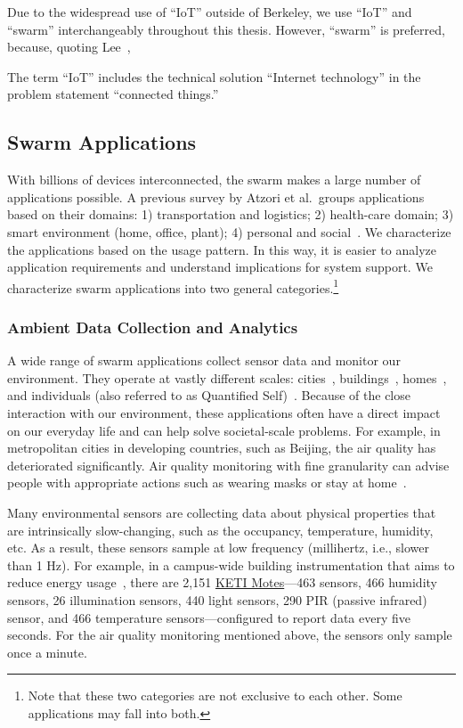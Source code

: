 Due to the widespread use of ``IoT'' outside of Berkeley, we use ``IoT'' and
``swarm'' interchangeably throughout this thesis. However, ``swarm'' is
preferred, because, quoting Lee~\cite{lee2016iot},

\begin{displayquote}
  The term ``IoT'' includes the technical solution ``Internet technology'' in
  the problem statement ``connected things.''
\end{displayquote}

\subsection{Swarm Applications}
\label{sec:swarm-applications}

With billions of devices interconnected, the swarm makes a large number of
applications possible. A previous survey by Atzori et al.\, groups applications
based on their domains: 1) transportation and logistics; 2) health-care domain;
3) smart environment (home, office, plant); 4) personal and
social~\cite{atzori2010internet}. We characterize the applications based on the
usage pattern. In this way, it is easier to analyze application requirements and
understand implications for system support. We characterize swarm applications
into two general categories.\footnote{Note that these two categories are not
  exclusive to each other. Some applications may fall into both.}

\subsubsection{Ambient Data Collection and Analytics}
\label{sec:ambi-data-coll}

A wide range of swarm applications collect sensor data and monitor our
environment. They operate at vastly different scales:
cities~\cite{cheng2014aircloud, sfpark}, buildings~\cite{dawson2010smap},
homes~\cite{hnat2011hitchhiker}, and individuals (also referred to as Quantified
Self)~\cite{fitbit, swan2013quantified}. Because of the close interaction with
our environment, these applications often have a direct impact on our everyday
life and can help solve societal-scale problems. For example, in metropolitan
cities in developing countries, such as Beijing, the air quality has
deteriorated significantly. Air quality monitoring with fine granularity can
advise people with appropriate actions such as wearing masks or stay at
home~\cite{cheng2014aircloud}.

Many environmental sensors are collecting data about physical properties that
are intrinsically slow-changing, such as the occupancy, temperature, humidity,
etc. As a result, these sensors sample at low frequency (millihertz, i.e.,
slower than 1 Hz). For example, in a campus-wide building instrumentation that
aims to reduce energy usage~\cite{krioukov2012building}, there are 2,151
\href{http://www.keti.re.kr/}{KETI Motes}---463  sensors, 466 humidity
sensors, 26 illumination sensors, 440 light sensors, 290 PIR (passive infrared)
sensor, and 466 temperature sensors---configured to report data every five
seconds. For the air quality monitoring mentioned above, the sensors only sample
once a minute.

